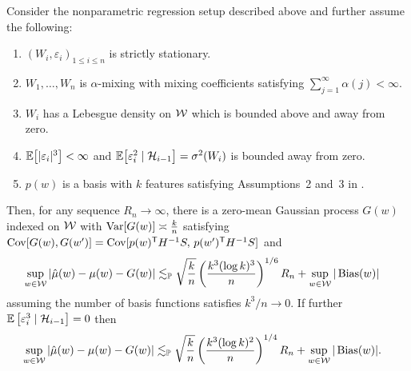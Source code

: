 \begin{proposition}%
  \label{pro:yurinskii_series}
  Consider the nonparametric regression setup described above
  and further assume the following:
  \begin{enumerate}[label=(\roman*)]

    \item
      $(W_i, \varepsilon_i)_{1 \leq i \leq n}$
      is strictly stationary.

    \item
      $W_1, \ldots, W_n$ is $\alpha$-mixing with mixing coefficients
      satisfying $\sum_{j=1}^\infty \alpha(j) < \infty$.

    \item
      $W_i$ has a Lebesgue density on $\mathcal{W}$
      which is bounded above and away from zero.

    \item
      $\mathbb{E}\big[|\varepsilon_i|^3 \big] < \infty$
      and
      $\mathbb{E}\big[\varepsilon_i^2 \mid \mathcal{H}_{i-1}\big]=\sigma^2(W_i)$
      is bounded away from zero.

    \item
      $p(w)$ is a basis with $k$ features satisfying
      Assumptions~2 and~3 in \citet{cattaneo2020large}.

  \end{enumerate}
  Then, for any sequence $R_n \to \infty$,
  there is a zero-mean Gaussian process
  $G(w)$ indexed on $\mathcal{W}$
  with $\operatorname{Var}[G(w)] \asymp\frac{k}{n}$
  satisfying
  $\operatorname{Cov}[G(w), G(w')]
  = \operatorname{Cov}[p(w)^{\mathsf{T}} H^{-1} S,\, p(w')^{\mathsf{T}} H^{-1} S]$
  and
  \begin{align*}
    \sup_{w \in \mathcal{W}}
    \left| \hat\mu(w) - \mu(w) - G(w) \right|
    &\lesssim_{\mathbb{P}}
    \sqrt{\frac{k}{n}}
    \left( \frac{k^3 (\log k)^3}{n} \right)^{1/6} R_n
    + \sup_{w \in \mathcal{W}} |\operatorname{Bias}(w)|
  \end{align*}
  assuming the number of basis functions satisfies $k^3 / n \to 0$.
  If further $\mathbb{E} \left[ \varepsilon_i^3 \mid \mathcal{H}_{i-1} \right] = 0$ then
  \begin{align*}
    \sup_{w \in \mathcal{W}}
    \left| \hat\mu(w) - \mu(w) - G(w) \right|
    &\lesssim_{\mathbb{P}}
    \sqrt{\frac{k}{n}}
    \left( \frac{k^3 (\log k)^2}{n} \right)^{1/4} R_n
    + \sup_{w \in \mathcal{W}} |\operatorname{Bias}(w)|.
  \end{align*}
\end{proposition}

